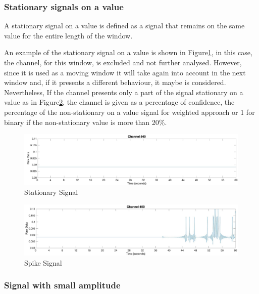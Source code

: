 \subsubsection*{Stationary signals on a value}\label{cap:stationary}
A stationary signal on a value is defined as a signal that remains on the same value for the entire length of the window.

An example of the stationary signal on a value is shown in Figure\ref{fig:stationaryTotal}, in this case, the channel, for this window, is excluded and not further analysed.
However, since it is used as a moving window it will take again into account in the next window and, if it presents a different behaviour, it maybe is considered. 
Nevertheless, If the channel presents only a part of the signal stationary on a value as in Figure\ref{fig:spikePartial}, the channel is given as a percentage of confidence, the percentage of the non-stationary on a value signal for weighted approach or 1 for binary if the non-stationary value is more than 20\%.
\vspace*{0.5cm}
\begin{figure}[H]
    \centering
    \includegraphics[width=\textwidth]{img/stationaryTotal.jpg}
    \caption{Stationary Signal}
    \label{fig:stationaryTotal}
\end{figure}

\begin{figure}[H]
    \centering
    \includegraphics[width=\textwidth]{img/spakePartial.jpg}
    \caption{Spike Signal}
    \label{fig:spikePartial}
\end{figure}

\subsubsection*{Signal with small amplitude}\label{cap:noisy}


